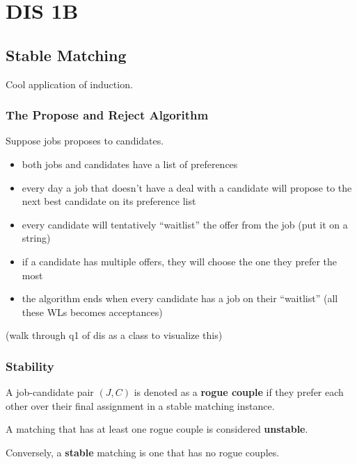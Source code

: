 \section{DIS 1B}

\subsection{Stable Matching}

Cool application of induction. 

\subsubsection{The Propose and Reject Algorithm}

Suppose jobs proposes to candidates. 

\begin{itemize}
    \item both jobs and candidates have a list of preferences 
    \item every day a job that doesn't have a deal with a candidate will propose to the next best candidate on its preference list
    \item every candidate will tentatively ``waitlist'' the offer from the job (put it on a string)
    \item if a candidate has multiple offers, they will choose the one they prefer the most
    \item the algorithm ends when every candidate has a job on their ``waitlist'' (all these WLs becomes acceptances)
\end{itemize}

(walk through q1 of dis as a class to visualize this)

\subsubsection{Stability}
\begin{definition}
    A job-candidate pair $(J,C)$ is denoted as a \textbf{rogue couple} if they prefer each other over their final assignment in a stable matching instance. 
\end{definition}

\begin{definition}[Unstable]
    A matching that has at least one rogue couple is considered \textbf{unstable}.
\end{definition}

Conversely, a \textbf{stable} matching is one that has no rogue couples. 

